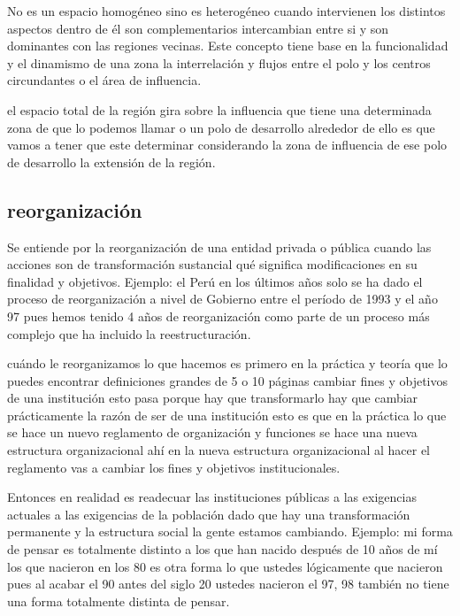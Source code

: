 \documentclass[
  a4paper,
]{article}
\begin{document}
No es un espacio homogéneo sino es heterogéneo cuando intervienen los
distintos aspectos dentro de él son complementarios intercambian entre
si y son dominantes con las regiones vecinas. Este concepto tiene base
en la funcionalidad y el dinamismo de una zona la interrelación y flujos
entre el polo y los centros circundantes o el área de influencia.

el espacio total de la región gira sobre la influencia que tiene una
determinada zona de que lo podemos llamar o un polo de desarrollo
alrededor de ello es que vamos a tener que este determinar considerando
la zona de influencia de ese polo de desarrollo la extensión de la
región.

\hypertarget{reorganizaciuxf3n}{%
\subsection{reorganización}\label{reorganizaciuxf3n}}

Se entiende por la reorganización de una entidad privada o pública
cuando las acciones son de transformación sustancial qué significa
modificaciones en su finalidad y objetivos. Ejemplo: el Perú en los
últimos años solo se ha dado el proceso de reorganización a nivel de
Gobierno entre el período de 1993 y el año 97 pues hemos tenido 4 años
de reorganización como parte de un proceso más complejo que ha incluido
la reestructuración.

cuándo le reorganizamos lo que hacemos es primero en la práctica y
teoría que lo puedes encontrar definiciones grandes de 5 o 10 páginas
cambiar fines y objetivos de una institución esto pasa porque hay que
transformarlo hay que cambiar prácticamente la razón de ser de una
institución esto es que en la práctica lo que se hace un nuevo
reglamento de organización y funciones se hace una nueva estructura
organizacional ahí en la nueva estructura organizacional al hacer el
reglamento vas a cambiar los fines y objetivos institucionales.

Entonces en realidad es readecuar las instituciones públicas a las
exigencias actuales a las exigencias de la población dado que hay una
transformación permanente y la estructura social la gente estamos
cambiando. Ejemplo: mi forma de pensar es totalmente distinto a los que
han nacido después de 10 años de mí los que nacieron en los 80 es otra
forma lo que ustedes lógicamente que nacieron pues al acabar el 90 antes
del siglo 20 ustedes nacieron el 97, 98 también no tiene una forma
totalmente distinta de pensar.
\end{document}
